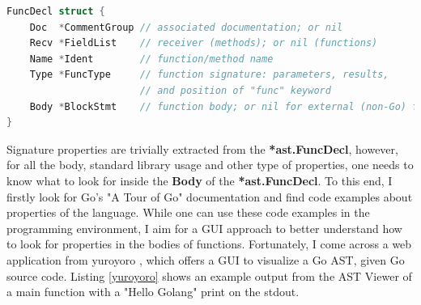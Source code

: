 \documentclass{seal_thesis}
\begin{document}
\begin{lstlisting}[caption=*ast.FuncDecl declaration in Go., label={funcdecl}, language=Go, frame=single]
FuncDecl struct {
	Doc  *CommentGroup // associated documentation; or nil
	Recv *FieldList    // receiver (methods); or nil (functions)
	Name *Ident        // function/method name
	Type *FuncType     // function signature: parameters, results, 
					   // and position of "func" keyword
	Body *BlockStmt    // function body; or nil for external (non-Go) function
}
\end{lstlisting}

\noindent Signature properties are trivially extracted from the \textbf{*ast.FuncDecl}, however, for all the body, standard library usage and other type of properties, one needs to know what to look for inside the \textbf{Body} of the \textbf{*ast.FuncDecl}. To this end, I firstly look for Go's "A Tour of Go" documentation \cite{atourofgo} and find code examples about properties of the language. While one can use these code examples in the programming environment, I aim for a GUI approach to better understand how to look for properties in the bodies of functions. Fortunately, I come across a web application from yuroyoro \cite{goastviewer}, which offers a GUI to visualize a Go AST, given Go source code. Listing \ref{yuroyoro} shows an example output from the AST Viewer of a main function with a "Hello Golang" print on the stdout.
\end{document}
